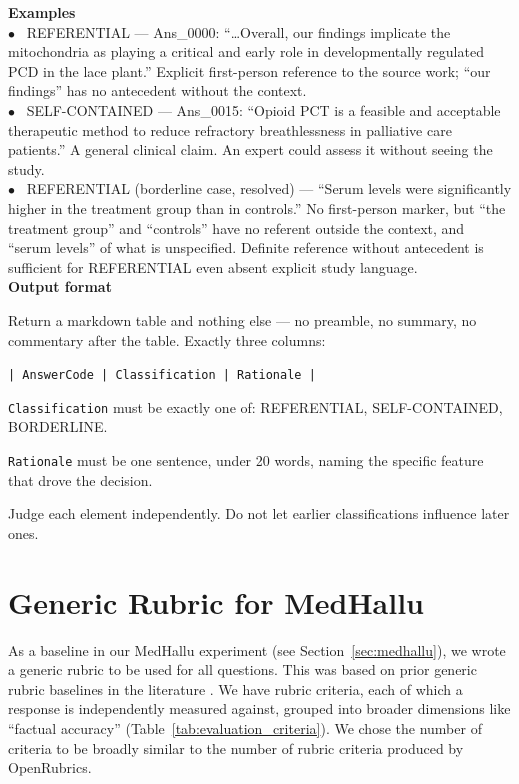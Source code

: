 \documentclass{article}
\newcommand{\appendixsection}[1]{%
  \section{#1}%
  \addcontentsline{apc}{section}{\protect\numberline{\thesection}#1}%
}
\begin{document}
\begin{promptbox}
\textbf{Examples} \\
     $\bullet$~ REFERENTIAL --- Ans\_0000: ``\ldots Overall, our findings implicate the mitochondria as playing a critical and early role in developmentally regulated PCD in the lace plant.'' Explicit first-person reference to the source work; ``our findings'' has no antecedent without the context. \\ 
     $\bullet$~ SELF-CONTAINED --- Ans\_0015: ``Opioid PCT is a feasible and acceptable therapeutic method to reduce refractory breathlessness in palliative care patients.'' A general clinical claim. An expert could assess it without seeing the study. \\
     $\bullet$~ REFERENTIAL (borderline case, resolved) --- ``Serum levels were significantly higher in the treatment group than in controls.'' No first-person marker, but ``the treatment group'' and ``controls'' have no referent outside the context, and ``serum levels'' of what is unspecified. Definite reference without antecedent is sufficient for REFERENTIAL even absent explicit study language. \\

\textbf{Output format}

Return a markdown table and nothing else --- no preamble, no summary, no commentary after the table. Exactly three columns:

\begin{center}
\texttt{| AnswerCode | Classification | Rationale |}
\end{center}

\texttt{Classification} must be exactly one of: REFERENTIAL, SELF-CONTAINED, BORDERLINE.

\texttt{Rationale} must be one sentence, under 20 words, naming the specific feature that drove the decision.

Judge each element independently. Do not let earlier classifications influence later ones.
\end{promptbox}

\newpage
\onecolumn
\appendixsection{Generic Rubric for MedHallu}
\label{appendix:generic-rubric}
As a baseline in our MedHallu experiment (see Section~\ref{sec:medhallu}), we wrote a generic rubric to be used for all questions. This was based on prior generic rubric baselines in the literature \citep{arorahealthbench2025, chen_automated_2026}. We have rubric criteria, each of which a response is independently measured against, grouped into broader dimensions like ``factual accuracy'' (Table~\ref{tab:evaluation_criteria}). We chose the number of criteria to be broadly similar to the number of rubric criteria produced by OpenRubrics.
\end{document}
